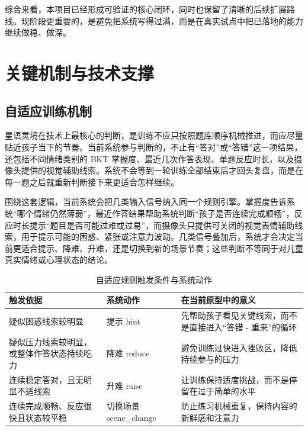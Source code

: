 综合来看，本项目已经形成可验证的核心闭环，同时也保留了清晰的后续扩展路线。现阶段更重要的，是避免把系统写得过满，而是在真实试点中把已落地的能力继续做稳、做深。

\chapter{关键机制与技术支撑}

\section{自适应训练机制}
星语灵境在技术上最核心的判断，是训练不应只按照题库顺序机械推进，而应尽量贴近孩子当下的节奏。当前系统参与判断的，不止有“答对”或“答错”这一项结果，还包括不同情绪类别的 BKT 掌握度、最近几次作答表现、单题反应时长，以及摄像头提供的视觉辅助线索。系统不会等到一轮训练全部结束后才回头复盘，而是在每一题之后就重新判断接下来更适合怎样继续。


围绕这套逻辑，当前系统会把几类输入信号纳入同一个规则引擎。掌握度告诉系统“哪个情绪仍然薄弱”，最近作答结果帮助系统判断“孩子是否连续完成顺畅”，反应时长提示“题目是否可能过难或过易”，而摄像头只提供可关闭的视觉表情辅助线索，用于提示可能的困惑、紧张或注意力波动。几类信号叠加后，系统才会决定当前更适合提示、降难、升难，还是切换到新的场景节奏；这些判断不等同于对儿童真实情绪或心理状态的结论。

\begin{table}[H]
\centering
\caption{自适应规则触发条件与系统动作}
\small
\begin{tabularx}{0.96\textwidth}{>{\raggedright\arraybackslash}p{} >{\raggedright\arraybackslash}p{} X}
\toprule
触发依据 & 系统动作 & 在当前原型中的意义 \\
\midrule
疑似困惑线索较明显 & 提示 hint & 先帮助孩子看见关键线索，而不是直接进入“答错 - 重来”的循环 \\
疑似压力线索较明显，或整体作答状态持续吃力 & 降难 reduce & 避免训练过快进入挫败区，降低持续参与的压力 \\
连续稳定答对，且无明显不适线索 & 升难 raise & 让训练保持适度挑战，而不是停留在过于简单的水平 \\
连续完成顺畅、反应很快且状态较平稳 & 切换场景 scene\_change & 防止练习机械重复，保持内容的新鲜感和注意力 \\
\bottomrule
\end{tabularx}
\end{table}

